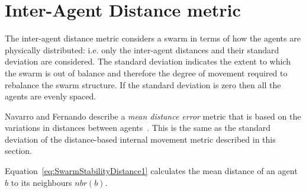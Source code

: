 \documentclass{ieeeaccess}
\begin{document}
\section{Inter-Agent Distance metric}\label{Section:DistanceDynamics}
The inter-agent distance metric considers a swarm in terms of how the agents
are physically distributed: i.e. only the inter-agent distances and their
standard deviation are considered. The standard deviation indicates the extent
to which the swarm is out of balance and therefore the degree of movement
required to rebalance the swarm structure. If the standard deviation is zero
then all the agents are evenly spaced. 


Navarro and Fernando describe a \textit{mean distance error} metric that is
based on the variations in distances between agents~\cite{NIM:09}.
This is the same as the standard deviation of the distance-based internal
movement metric described in this section.



Equation~\ref{eq:SwarmStabilityDistance1} calculates the mean distance of an agent $b$ to its neighbours $nbr(b)$. 
\end{document}
